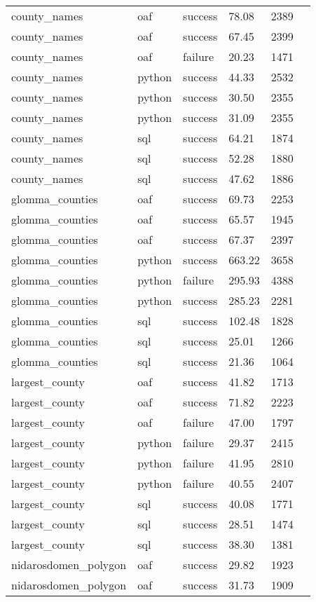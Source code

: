 \begin{longtable}{lp{1.8cm}p{1.8cm}p{1.8cm}p{1.8cm}p{1.8cm}}
county\_names & oaf & success & 78.08 & 2389 \\
county\_names & oaf & success & 67.45 & 2399 \\
county\_names & oaf & failure & 20.23 & 1471 \\
county\_names & python & success & 44.33 & 2532 \\
county\_names & python & success & 30.50 & 2355 \\
county\_names & python & success & 31.09 & 2355 \\
county\_names & sql & success & 64.21 & 1874 \\
county\_names & sql & success & 52.28 & 1880 \\
county\_names & sql & success & 47.62 & 1886 \\
glomma\_counties & oaf & success & 69.73 & 2253 \\
glomma\_counties & oaf & success & 65.57 & 1945 \\
glomma\_counties & oaf & success & 67.37 & 2397 \\
glomma\_counties & python & success & 663.22 & 3658 \\
glomma\_counties & python & failure & 295.93 & 4388 \\
glomma\_counties & python & success & 285.23 & 2281 \\
glomma\_counties & sql & success & 102.48 & 1828 \\
glomma\_counties & sql & success & 25.01 & 1266 \\
glomma\_counties & sql & success & 21.36 & 1064 \\
largest\_county  & oaf & success & 41.82 & 1713 \\
largest\_county  & oaf & success & 71.82 & 2223 \\
largest\_county  & oaf & failure & 47.00 & 1797 \\
largest\_county  & python & failure & 29.37 & 2415 \\
largest\_county  & python & failure & 41.95 & 2810 \\
largest\_county  & python & failure & 40.55 & 2407 \\
largest\_county  & sql & success & 40.08 & 1771 \\
largest\_county  & sql & success & 28.51 & 1474 \\
largest\_county  & sql & success & 38.30 & 1381 \\
nidarosdomen\_polygon & oaf & success & 29.82 & 1923 \\
nidarosdomen\_polygon & oaf & success & 31.73 & 1909 \\

\end{longtable}
